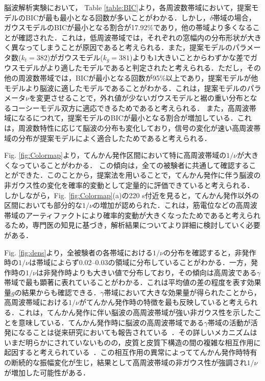 \documentclass[journal]{IEEEtran}
\begin{document}
脳波解析実験において，
Table \ref{table:BIC}より，各周波数帯域において，提案モデルのBICが最も最小となる回数が多いことがわかる．しかし，$\delta$帯域の場合，ガウスモデルのBICが最小となる割合が17.92\%であり，他の帯域より多くなることが確認された．これは，低周波帯域では，それぞれの窓幅内の分布形状が大きく異なってしまうことが原因であると考えられる．また，提案モデルのパラメータ数($k_t=382$)がガウスモデル($k_g=381$)よりも1大きいことからわずかな差でガウスモデルがより適したモデルであると判定されたと考えられる．ただし，その他の周波数帯域では，BICが最小となる回数が95\%以上であり，提案モデルが他モデルより脳波に適したモデルであることがわかる．これは，提案モデルのパラメータ$\nu$を変更させることで，外れ値が少ないガウスモデルと裾の重い分布となるコーシーモデル双方に適応できるためであると考えられる．
また，高周波帯域になるにつれて，提案モデルのBICが最小となる割合が増加している．これは，周波数特性に応じて脳波の分布も変化しており，信号の変化が速い高周波帯域の分布が提案モデルによく適合したためであると考えられる．

Fig. \ref{fig:Colormap}より，てんかん発作区間において特に高周波帯域の$1/\nu$が大きくなっていることがわかる．
この傾向は，全ての被験者に共通して確認することができた．このことから，提案法を用いることで，てんかん発作に伴う脳波の非ガウス性の変化を確率的変動として定量的に評価できていると考えられる．
しかしながら，Fig. \ref{fig:Colormap}(a)の220 s付近を見ると，てんかん発作以外の区間においても部分的な$1/\nu$の増加が認められた．これは，筋電位などの高周波帯域のアーティファクトにより確率的変動が大きくなったためであると考えられるため，専門医の知見に基づき，解析結果についてより詳細に検討していく必要がある．

Fig. \ref{fig:dens}より，全被験者の各帯域における$1/\nu$の分布を確認すると，非発作時の$1/\nu$は帯域によらず0.02--0.03の領域に分布していることがわかる．一方，発作時の$1/\nu$は非発作時よりも大きい値で分布しており，その傾向は高周波である$\gamma$帯域で最も顕著に表れていることがわかる．これは平均値の差の程度を表す効果量$g$の結果からも確認できる．$\gamma$帯域において大きな効果量が得られたことから，高周波帯域における$1/\nu$がてんかん発作時の特徴を最も反映していると考えられる．これは，てんかん発作に伴い脳波の高周波帯域が強い非ガウス性を示したことを意味している．てんかん発作時に脳波の高周波帯域である$\gamma$帯域の活動が活発になることは従来研究においても報告されている~\cite{Kobayashi2004,Kobayashi2009,Benedek2016}．その詳しいメカニズムはいまだ明らかにされていないものの，皮質と皮質下構造の間の複雑な相互作用に起因すると考えられている~\cite{Kobayashi2004}．この相互作用の異常によっててんかん発作時特有の断続的な振幅変化が生じ，結果として高周波帯域の非ガウス性が強調され$1/\nu$が増加した可能性がある．
\end{document}

